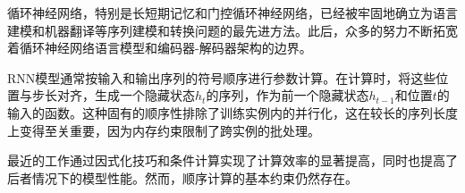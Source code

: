 
循环神经网络，特别是长短期记忆\citep{hochreiter1997}和门控循环\citep{gruEval14}神经网络，已经被牢固地确立为语言建模和机器翻译等序列建模和转换问题的最先进方法\citep{sutskever14, bahdanau2014neural, cho2014learning}。此后，众多的努力不断拓宽着循环神经网络语言模型和编码器-解码器架构的边界\citep{wu2016google,luong2015effective,jozefowicz2016exploring}。


RNN模型通常按输入和输出序列的符号顺序进行参数计算。在计算时，将这些位置与步长对齐，生成一个隐藏状态$h_t$的序列，作为前一个隐藏状态$h_{t-1}$和位置$t$的输入的函数。这种固有的顺序性排除了训练实例内的并行化，这在较长的序列长度上变得至关重要，因为内存约束限制了跨实例的批处理。


最近的工作通过因式化技巧\citep{Kuchaiev2017Factorization}和条件计算\citep{shazeer2017outrageously}实现了计算效率的显著提高，同时也提高了后者情况下的模型性能。然而，顺序计算的基本约束仍然存在。


